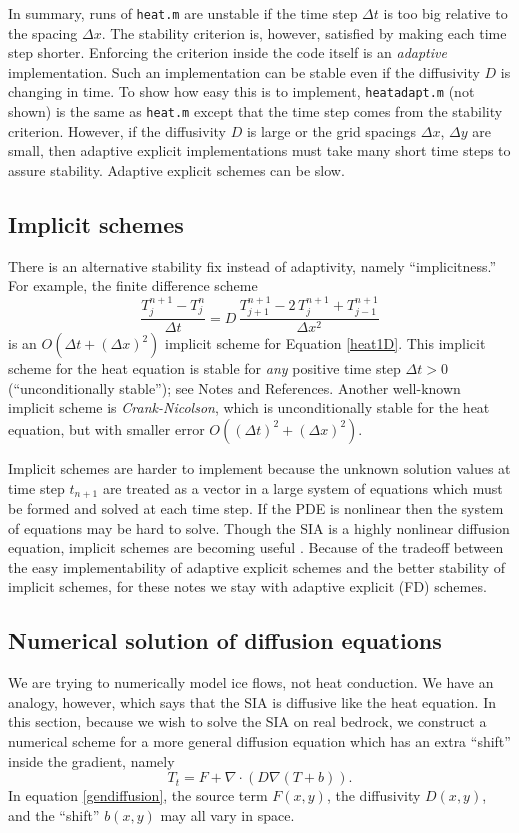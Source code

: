 \documentclass[letterpaper,final,12pt,reqno]{amsart}
\newcommand{\grad}{\nabla}
\newcommand{\Div}{\nabla\cdot}
\begin{document}
In summary, runs of \texttt{heat.m} are unstable if the time step $\Delta t$ is too big relative to the spacing $\Delta x$.  The stability criterion is, however, satisfied by making each time step shorter.  Enforcing the criterion inside the code itself is an \emph{adaptive} implementation.  Such an implementation can be stable even if the diffusivity $D$ is changing in time.  To show how easy this is to implement, \texttt{heatadapt.m} (not shown) is the same as \texttt{heat.m} except that the time step comes from the stability criterion.  However, if the diffusivity $D$ is large or the grid spacings $\Delta x$, $\Delta y$ are small, then adaptive explicit implementations must take many short time steps to assure stability.  Adaptive explicit schemes can be slow.

\subsection*{Implicit schemes}  There is an alternative stability fix instead of adaptivity, namely ``implicitness.''  For example, the finite difference scheme
\begin{equation}
  \frac{T_j^{n+1} - T_j^n}{\Delta t} = D\,\frac{T_{j+1}^{n+1} - 2\, T_j^{n+1} + T_{j-1}^{n+1}}{\Delta x^2} \label{implicit1D}
\end{equation}
is an $O(\Delta t + (\Delta x)^2)$ implicit scheme for Equation \eqref{heat1D}.  This implicit scheme for the heat equation is stable for \emph{any} positive time step $\Delta t>0$ (``unconditionally stable''); see Notes and References.  Another well-known implicit scheme is \emph{Crank-Nicolson}, which is unconditionally stable for the heat equation, but with smaller error $O((\Delta t)^2 +(\Delta x)^2)$.

Implicit schemes are harder to implement because the unknown solution values at time step $t_{n+1}$ are treated as a vector in a large system of equations which must be formed and solved at each time step.  If the PDE is nonlinear then the system of equations may be hard to solve.  Though the SIA is a highly nonlinear diffusion equation, implicit schemes are becoming useful \cite{Bueler2016}.  Because of the tradeoff between the easy implementability of adaptive explicit schemes and the better stability of implicit schemes, for these notes we stay with adaptive explicit (FD) schemes.

\subsection*{Numerical solution of diffusion equations}  We are trying to numerically model ice flows, not heat conduction.  We have an analogy, however, which says that the SIA is diffusive like the heat equation.  In this section, because we wish to solve the SIA on real bedrock, we construct a numerical scheme for a more general diffusion equation which has an extra ``shift'' inside the gradient, namely
\begin{equation}
  T_t = F + \Div \left(D \grad (T + b)\right). \label{gendiffusion}
\end{equation}
In equation \eqref{gendiffusion}, the source term $F(x,y)$, the diffusivity $D(x,y)$, and the ``shift'' $b(x,y)$ may all vary in space.
\end{document}
